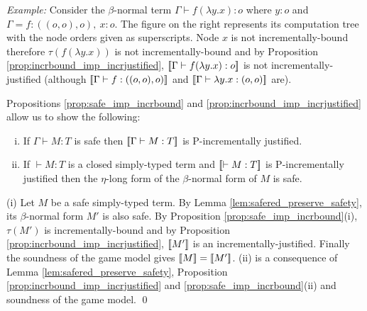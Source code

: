 

\noindent \emph{Example:} %
Consider the $\beta$-normal term $\Gamma\vdash f (\lambda y .x) : o$ where $y:o$ and $\Gamma =f:((o,o),o),~x:o$. The figure on the right represents its computation tree
with the node orders given as superscripts.  Node $x$ is not
incrementally-bound therefore $\tau(f (\lambda y .x))$ is not
incrementally-bound and by Proposition
\ref{prop:incrbound_imp_incrjustified}, ${[\![ \Gamma \vdash f (\lambda y .x) : o ]\!]}$ is
not incrementally-justified (although ${[\![ \Gamma \vdash f : ((o,o),o) ]\!]}$ and ${[\![ \Gamma \vdash \lambda
  y. x : (o,o) ]\!]}$ are).
\smallskip

Propositions \ref{prop:safe_imp_incrbound} and
\ref{prop:incrbound_imp_incrjustified} allow us to show the following:
\begin{theorem}
\label{thm:safeincrejust} \hfill
\begin{enumerate}[(i)]
\item If $\Gamma \vdash M : T$ is safe then ${[\![ \Gamma \vdash M : T ]\!]}$ is P-incrementally justified.
\item If $\vdash M : T$ is a closed simply-typed term and ${[\![ \vdash M : T ]\!]}$ is P-incrementally justified then the $\eta$-long form of the $\beta$-normal form of $M$ is safe.
\end{enumerate}
\end{theorem}
\proof
(i) Let $M$ be a safe simply-typed term. By Lemma
\ref{lem:safered_preserve_safety}, its $\beta$-normal form $M'$ is
also safe. By Proposition \ref{prop:safe_imp_incrbound}(i), $\tau(M')$
is incrementally-bound and by Proposition
\ref{prop:incrbound_imp_incrjustified}, ${[\![ M' ]\!]}$ is an
incrementally-justified. Finally the soundness of the game model gives
${[\![ M ]\!]} = {[\![ M' ]\!]}$.  (ii) is a consequence of Lemma
\ref{lem:safered_preserve_safety}, Proposition
\ref{prop:incrbound_imp_incrjustified} and
\ref{prop:safe_imp_incrbound}(ii) and soundness of the game model.
\qed



